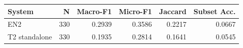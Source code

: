 \begin{tabular}{lrrrrr}
\toprule
System & N & Macro-F1 & Micro-F1 & Jaccard & Subset Acc. \\
\midrule
EN2 & 330 & 0.2939 & 0.3586 & 0.2217 & 0.0667 \\
T2 standalone & 330 & 0.1935 & 0.2814 & 0.1641 & 0.0545 \\
\bottomrule
\end{tabular}
